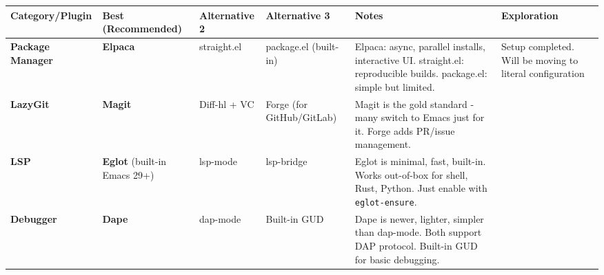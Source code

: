 \documentclass[
  letterpaper,
  DIV=11,
  numbers=noendperiod]{scrreprt}
\begin{document}
\begin{longtable}[]{@{}
  >{\raggedright\arraybackslash}p{}
  >{\raggedright\arraybackslash}p{}
  >{\raggedright\arraybackslash}p{}
  >{\raggedright\arraybackslash}p{}
  >{\raggedright\arraybackslash}p{}
  >{\raggedright\arraybackslash}p{}@{}}
\toprule\noalign{}
\begin{minipage}[b]{\linewidth}\raggedright
\textbf{Category/Plugin}
\end{minipage} & \begin{minipage}[b]{\linewidth}\raggedright
\textbf{Best (Recommended)}
\end{minipage} & \begin{minipage}[b]{\linewidth}\raggedright
\textbf{Alternative 2}
\end{minipage} & \begin{minipage}[b]{\linewidth}\raggedright
\textbf{Alternative 3}
\end{minipage} & \begin{minipage}[b]{\linewidth}\raggedright
\textbf{Notes}
\end{minipage} & \begin{minipage}[b]{\linewidth}\raggedright
\textbf{Exploration}
\end{minipage} \\
\midrule\noalign{}
\endhead
\bottomrule\noalign{}
\endlastfoot
\textbf{Package Manager} & \textbf{Elpaca} & straight.el & package.el
(built-in) & Elpaca: async, parallel installs, interactive UI.
straight.el: reproducible builds. package.el: simple but limited. &
Setup completed. Will be moving to literal configuration \\
\textbf{LazyGit} & \textbf{Magit} & Diff-hl + VC & Forge (for
GitHub/GitLab) & Magit is the gold standard - many switch to Emacs just
for it. Forge adds PR/issue management. & \\
\textbf{LSP} & \textbf{Eglot} (built-in Emacs 29+) & lsp-mode &
lsp-bridge & Eglot is minimal, fast, built-in. Works out-of-box for
shell, Rust, Python. Just enable with \texttt{eglot-ensure}. & \\
\textbf{Debugger} & \textbf{Dape} & dap-mode & Built-in GUD & Dape is
newer, lighter, simpler than dap-mode. Both support DAP protocol.
Built-in GUD for basic debugging. & \\

\end{longtable}
\end{document}
